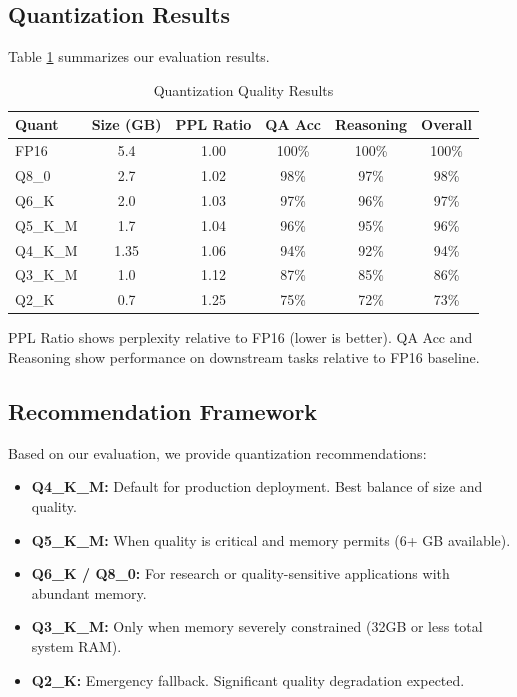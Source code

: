 \subsection{Quantization Results}

Table \ref{tab:quantization_results} summarizes our evaluation results.

\begin{table}[h]
\centering
\caption{Quantization Quality Results}
\label{tab:quantization_results}
\begin{tabular}{lccccc}
\toprule
\textbf{Quant} & \textbf{Size (GB)} & \textbf{PPL Ratio} & \textbf{QA Acc} & \textbf{Reasoning} & \textbf{Overall} \\
\midrule
FP16 & 5.4 & 1.00 & 100\% & 100\% & 100\% \\
Q8\_0 & 2.7 & 1.02 & 98\% & 97\% & 98\% \\
Q6\_K & 2.0 & 1.03 & 97\% & 96\% & 97\% \\
Q5\_K\_M & 1.7 & 1.04 & 96\% & 95\% & 96\% \\
Q4\_K\_M & 1.35 & 1.06 & 94\% & 92\% & 94\% \\
Q3\_K\_M & 1.0 & 1.12 & 87\% & 85\% & 86\% \\
Q2\_K & 0.7 & 1.25 & 75\% & 72\% & 73\% \\
\bottomrule
\end{tabular}
\end{table}

PPL Ratio shows perplexity relative to FP16 (lower is better). QA Acc and Reasoning show performance on downstream tasks relative to FP16 baseline.

\subsection{Recommendation Framework}

Based on our evaluation, we provide quantization recommendations:

\begin{tcolorbox}[title=Quantization Selection Guide]
\begin{itemize}
    \item \textbf{Q4\_K\_M:} Default for production deployment. Best balance of size and quality.
    \item \textbf{Q5\_K\_M:} When quality is critical and memory permits (6+ GB available).
    \item \textbf{Q6\_K / Q8\_0:} For research or quality-sensitive applications with abundant memory.
    \item \textbf{Q3\_K\_M:} Only when memory severely constrained (32GB or less total system RAM).
    \item \textbf{Q2\_K:} Emergency fallback. Significant quality degradation expected.
\end{itemize}
\end{tcolorbox}

